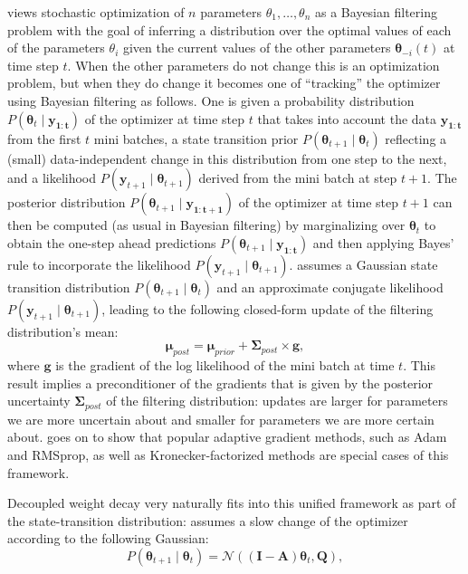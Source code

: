 \documentclass[usenames,dvipsnames]{article} %
\begin{document}
\citet{aitchison18} views stochastic optimization of $n$ parameters $\theta_1, \dots, \theta_n$ as a Bayesian filtering problem with the goal of inferring a distribution over the optimal values of each of the parameters $\theta_i$ given the current values of the other parameters $\bm{\theta}_{-i}(t)$ at time step $t$. When the other parameters do not change this is an optimization problem, but when they do change it becomes one of ``tracking'' the optimizer using Bayesian filtering as follows. One is given a probability distribution $P(\bm{\theta}_{t} \mid \bm{y_{1:t}})$ of the optimizer at time step $t$ that takes into account the data $\bm{y_{1:t}}$ from the first $t$ mini batches, a state transition prior $P(\bm{\theta}_{t+1} \mid \bm{\theta}_t)$ reflecting a (small) data-independent change in this distribution from one step to the next, and a likelihood $P(\bm{y}_{t+1} \mid \bm{\theta}_{t+1})$ derived from the mini batch at step $t+1$. The posterior distribution $P(\bm{\theta}_{t+1} \mid \bm{y_{1:t+1}})$ of the optimizer at time step $t+1$ can then be computed (as usual in Bayesian filtering) by marginalizing over $\bm{\theta}_{t}$ to obtain the one-step ahead predictions $P(\bm{\theta}_{t+1} \mid \bm{y_{1:t}})$ and then applying Bayes' rule to incorporate the likelihood $P(\bm{y}_{t+1} \mid \bm{\theta}_{t+1})$. \citet{aitchison18} assumes a Gaussian state transition distribution $P(\bm{\theta}_{t+1} \mid \bm{\theta}_t)$ and an approximate conjugate likelihood $P(\bm{y}_{t+1} \mid \bm{\theta}_{t+1})$, leading to the following closed-form update of the filtering distribution's mean:
\begin{equation}
\bm{\mu}_{post} = \bm{\mu}_{prior} + \bm{\Sigma}_{post} \times \bm{g},
\end{equation}
where $\bm{g}$ is the gradient of the log likelihood of the mini batch at time $t$.
This result implies a preconditioner of the gradients that is given by the posterior uncertainty $\bm{\Sigma}_{post}$ of the filtering distribution: updates are larger for parameters we are more uncertain about and smaller for parameters we are more certain about. 
%
\citet{aitchison18} goes on to show that popular adaptive gradient methods, such as Adam and RMSprop, as well as Kronecker-factorized methods are special cases of this framework.

Decoupled weight decay very naturally fits into this unified framework as part of the state-transition distribution: \citet{aitchison18} assumes a slow change of the optimizer according to the following Gaussian:
\begin{equation}
\label{eq:aitchison}P(\bm{\theta}_{t+1} \mid \bm{\theta}_t) = \mathcal{N}((\bm{I}-\bm{A}) \bm{\theta}_t, \bm{Q}),
\end{equation}
\end{document}
